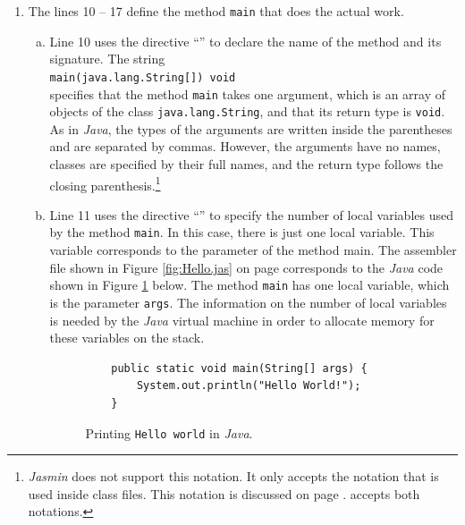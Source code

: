 \begin{enumerate}
      As this code is copied verbatim to the beginning 
      of every class file, we will not discuss it further. 
\item The lines 10 -- 17 define the method \texttt{main} that does the actual work.
  \begin{enumerate}[(a)]
  \item Line 10 uses the directive ``\texttt{}'' to declare the name of the method and its
        signature.  The string 
        \\[0.2cm]
        \hspace*{1.3cm}
        \texttt{main(java.lang.String[]) void}
        \\[0.2cm]
        specifies that the method \texttt{main} takes one argument, which is an array of objects of the
        class \texttt{java.lang.String}, and that its return type is \texttt{void}.  As in \textsl{Java}, the
        types of the arguments are written inside the parentheses and are separated by commas.  However, the
        arguments have no names, classes are specified by their full names, and the return type follows the
        closing parenthesis.\footnote{
          \textsl{Jasmin} does not support this notation.  It only accepts the notation that is used inside
          class files.  This notation is discussed on page \pageref{jvm-descriptors}.  
          accepts both notations.}
  \item Line 11 uses the directive ``\texttt{}'' to specify the number of local variables 
        used by the method \texttt{main}.  In this case, there is just one local variable.  This variable
        corresponds to the parameter of the method main.  The assembler file shown in Figure
        \ref{fig:Hello.jas} on page \pageref{fig:Hello.jas} corresponds to the \textsl{Java} code
        shown in Figure \ref{fig:Hello.java} below.  The method \texttt{main} has one local
        variable, which is the parameter \texttt{args}.
        The information on the number of local variables is needed by the \textsl{Java} virtual
        machine in order to allocate memory for these variables on the stack.

        
\begin{figure}[!ht]
\centering
\begin{verbatim}
    public static void main(String[] args) {
        System.out.println("Hello World!");
    }
\end{verbatim}
\vspace*{-0.3cm}
\caption{Printing \texttt{Hello world} in \textsl{Java}.} 
\label{fig:Hello.java}
\end{figure}


\end{enumerate}
\end{enumerate}
